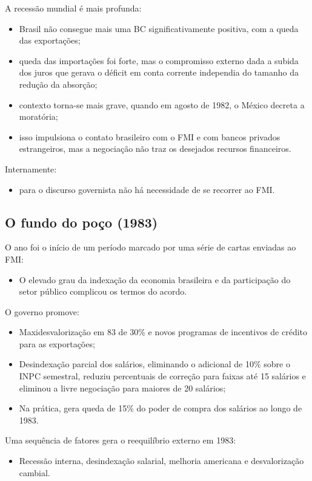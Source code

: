 \documentclass[a4paper,12pt]{article}[abntex2]
\begin{document}
A recessão mundial é mais profunda:
\begin{itemize}
    \item Brasil não consegue mais uma BC significativamente positiva, com a queda das exportações;
    \item queda das importações foi forte, mas o compromisso externo dada a subida dos juros que gerava o déficit em conta corrente independia do tamanho da redução da absorção;
    \item contexto torna-se mais grave, quando em agosto de 1982, o México decreta a moratória;
    \item isso impulsiona o contato brasileiro com o FMI e com bancos privados estrangeiros, mas a negociação não traz os desejados recursos financeiros.
\end{itemize}

Internamente:
\begin{itemize}
    \item para o discurso governista não há necessidade de se recorrer ao FMI.
\end{itemize}

\subsection{\textbf{O fundo do poço (1983)}}

O ano foi o início de um período marcado por uma série de cartas enviadas ao FMI:
\begin{itemize}
    \item O elevado grau da indexação da economia brasileira e da participação do setor público complicou os termos do acordo.
\end{itemize}

O governo promove:
\begin{itemize}
    \item Maxidesvalorização em 83 de 30\% e novos programas de incentivos de crédito para as exportações;
    \item Desindexação parcial dos salários, eliminando o adicional de 10\% sobre o INPC semestral, reduziu percentuais de correção para faixas até 15 salários e eliminou a livre negociação para maiores de 20 salários;
    \item Na prática, gera queda de 15\% do poder de compra dos salários ao longo de 1983.
\end{itemize}
    
Uma sequência de fatores gera o reequilíbrio externo em 1983:
\begin{itemize}
    \item Recessão interna, desindexação salarial, melhoria americana e desvalorização cambial.
\end{itemize}
\end{document}
